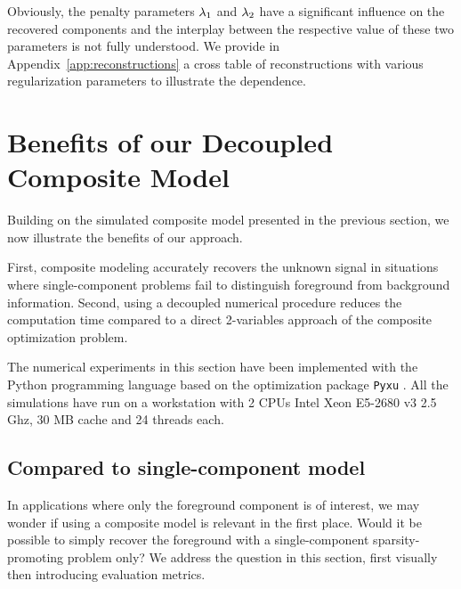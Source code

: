        Obviously, the penalty parameters $\lambda_{1}$ and $\lambda_{2}$ have a significant influence on the recovered components and the interplay between the respective value of these two parameters is not fully understood. We provide in Appendix~\ref{app:reconstructions} a cross table of reconstructions with various regularization parameters to illustrate the dependence. 
        
\section{Benefits of our Decoupled Composite Model}
    
    Building on the simulated composite model presented in the previous section, we now illustrate the benefits of our approach.
    
    First, composite modeling accurately recovers the unknown signal in situations where single-component problems fail to distinguish foreground from background information. Second, using a decoupled numerical procedure reduces the computation time compared to a direct 2-variables approach of the composite optimization problem.

    The numerical experiments in this section have been implemented with the Python programming language based on the optimization package \texttt{Pyxu} \cite{pyxu-framework}. All the simulations have run on a workstation with 2 CPUs Intel Xeon E5-2680 v3 \@2.5 Ghz, 30 MB cache and 24 threads each. 

    \subsection{Compared to single-component model}
    \label{sec:bene:comp}
        In applications where only the foreground component is of interest, we may wonder if using a composite model is relevant in the first place. Would it be possible to simply recover the foreground with a single-component sparsity-promoting problem only? We address the question in this section, first visually then introducing evaluation metrics.

